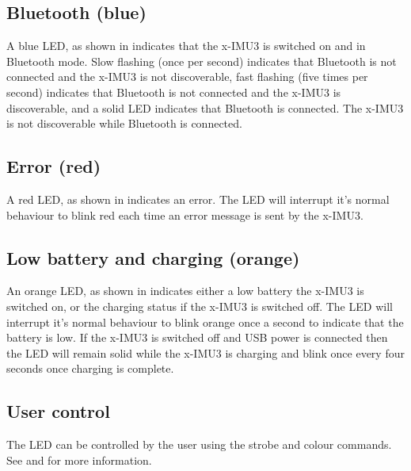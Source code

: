 
\subsection{Bluetooth (blue)}

A blue \ac{LED}, as shown in  indicates that the x-IMU3 is switched on and in Bluetooth mode.  Slow flashing (once per second) indicates that Bluetooth is not connected and the x-IMU3 is not discoverable, fast flashing (five times per second) indicates that Bluetooth is not connected and the x-IMU3 is discoverable, and a solid \ac{LED} indicates that Bluetooth is connected.  The x-IMU3 is not discoverable while Bluetooth is connected.


\subsection{Error (red)}

A red \ac{LED}, as shown in  indicates an error.  The \ac{LED} will interrupt it's normal behaviour to blink red each time an error message is sent by the x-IMU3.


\subsection{Low battery and charging (orange)}

An orange \ac{LED}, as shown in  indicates either a low battery the x-IMU3 is switched on, or the charging status if the x-IMU3 is switched off.  The \ac{LED} will interrupt it's normal behaviour to blink orange once a second to indicate that the battery is low.  If the x-IMU3 is switched off and USB power is connected then the \ac{LED} will remain solid while the x-IMU3 is charging and blink once every four seconds once charging is complete.


\subsection{User control}

The \ac{LED} can be controlled by the user using the strobe and colour commands.  See  and  for more information.
